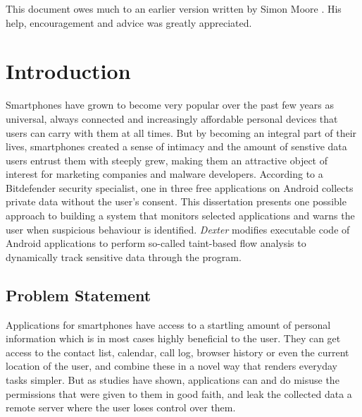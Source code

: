 \documentclass[12pt,twoside,notitlepage]{report}
\begin{document}
This document owes much to an earlier version written by Simon Moore
\cite{moore95}.  His help, encouragement and advice was greatly 
appreciated.


\cleardoublepage        %

\setcounter{page}{1}
\pagestyle{headings}

\chapter{Introduction}

Smartphones have grown to become very popular over the past few years as universal, always connected and increasingly affordable personal devices that users can carry with them at all times. But by becoming an integral part of their lives, smartphones created a sense of intimacy and the amount of senstive data users entrust them with steeply grew, making them an attractive object of interest for marketing companies and malware developers. According to a Bitdefender security specialist, one in three free applications on Android collects private data without the user's consent\cite{web:HuffingtonOneInThree}. This dissertation presents one possible approach to building a system that monitors selected applications and warns the user when suspicious behaviour is identified. \emph{Dexter} modifies executable code of Android applications to perform so-called taint-based flow analysis to dynamically track sensitive data through the program.

\section{Problem Statement}

Applications for smartphones have access to a startling amount of personal information which is in most cases highly beneficial to the user. They can get access to the contact list, calendar, call log, browser history or even the current location of the user, and combine these in a novel way that renders everyday tasks simpler. But as studies have shown\cite{web:Appthority}\cite{web:HuffingtonOneInThree}, applications can and do misuse the permissions that were given to them in good faith, and leak the collected data a remote server where the user loses control over them. 
\end{document}
